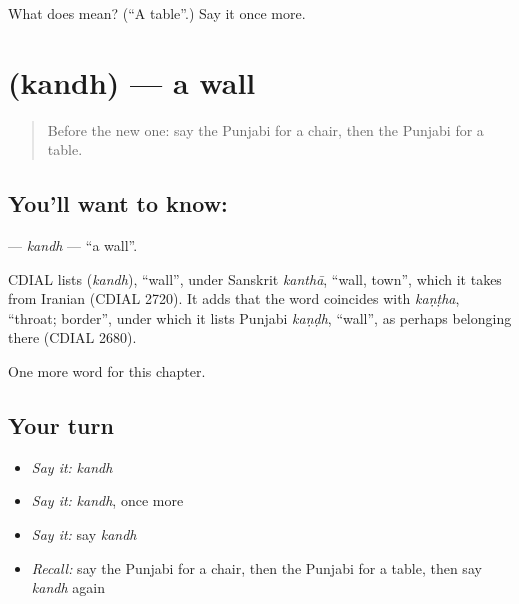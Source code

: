 \begin{tcolorbox}[breakable,colback=teal!4,colframe=teal!35!black,title={Before you move on}]
What does  mean? (\textquotedblleft{}A table\textquotedblright{}.) Say it once more.
\end{tcolorbox}
\section[\texorpdfstring{\pa{ਕੰਧ} (kandh)}{ਕੰਧ (kandh)}]{ (kandh) — a wall}

\label{lesson:PA-C68-kandh}



\begin{quote}
Before the new one: say the Punjabi for a chair, then the Punjabi for a table.
\end{quote}

\subsection*{You'll want to know: }
\textbf{} — \emph{kandh} — \textquotedblleft{}a wall\textquotedblright{}.

\begin{cousinweb}
CDIAL lists \textbf{} (\emph{kandh}), \textquotedblleft{}wall\textquotedblright{}, under Sanskrit \emph{kanthā}, \textquotedblleft{}wall, town\textquotedblright{}, which it takes from Iranian (CDIAL 2720). It adds that the word coincides with \emph{kaṇṭha}, \textquotedblleft{}throat; border\textquotedblright{}, under which it lists Punjabi \emph{kaṇḍh}, \textquotedblleft{}wall\textquotedblright{}, as perhaps belonging there (CDIAL 2680).
\end{cousinweb}

\begin{grammarlens}[title={What you've built}]
One more word for this chapter.
\end{grammarlens}

\subsection*{Your turn}
\begin{itemize}
\raggedright
  \item \emph{Say it:} \emph{kandh}
  \item \emph{Say it:} \emph{kandh}, once more
  \item \emph{Say it:} say \emph{kandh}
  \item \emph{Recall:} say the Punjabi for a chair, then the Punjabi for a table, then say \emph{kandh} again
\end{itemize}

